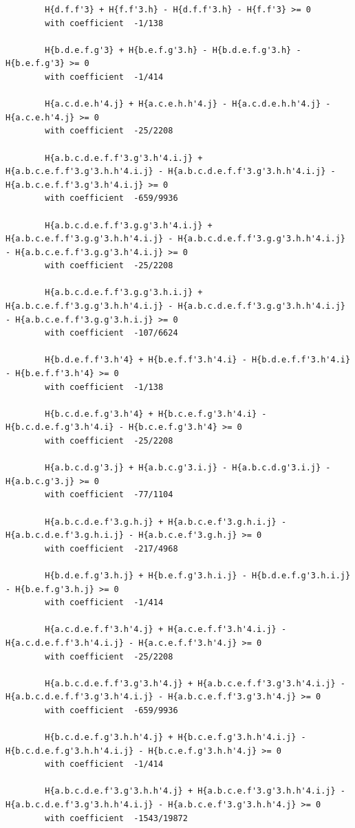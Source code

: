 \documentclass[11pt, a4paper]{kybernetika}
\begin{document}
\begin{verbatim}
		H{d.f.f'3} + H{f.f'3.h} - H{d.f.f'3.h} - H{f.f'3} >= 0
		with coefficient  -1/138
		
		H{b.d.e.f.g'3} + H{b.e.f.g'3.h} - H{b.d.e.f.g'3.h} - H{b.e.f.g'3} >= 0
		with coefficient  -1/414
		
		H{a.c.d.e.h'4.j} + H{a.c.e.h.h'4.j} - H{a.c.d.e.h.h'4.j} - H{a.c.e.h'4.j} >= 0
		with coefficient  -25/2208
		
		H{a.b.c.d.e.f.f'3.g'3.h'4.i.j} + H{a.b.c.e.f.f'3.g'3.h.h'4.i.j} - H{a.b.c.d.e.f.f'3.g'3.h.h'4.i.j} - H{a.b.c.e.f.f'3.g'3.h'4.i.j} >= 0
		with coefficient  -659/9936
		
		H{a.b.c.d.e.f.f'3.g.g'3.h'4.i.j} + H{a.b.c.e.f.f'3.g.g'3.h.h'4.i.j} - H{a.b.c.d.e.f.f'3.g.g'3.h.h'4.i.j} - H{a.b.c.e.f.f'3.g.g'3.h'4.i.j} >= 0
		with coefficient  -25/2208
		
		H{a.b.c.d.e.f.f'3.g.g'3.h.i.j} + H{a.b.c.e.f.f'3.g.g'3.h.h'4.i.j} - H{a.b.c.d.e.f.f'3.g.g'3.h.h'4.i.j} - H{a.b.c.e.f.f'3.g.g'3.h.i.j} >= 0
		with coefficient  -107/6624
		
		H{b.d.e.f.f'3.h'4} + H{b.e.f.f'3.h'4.i} - H{b.d.e.f.f'3.h'4.i} - H{b.e.f.f'3.h'4} >= 0
		with coefficient  -1/138
		
		H{b.c.d.e.f.g'3.h'4} + H{b.c.e.f.g'3.h'4.i} - H{b.c.d.e.f.g'3.h'4.i} - H{b.c.e.f.g'3.h'4} >= 0
		with coefficient  -25/2208
		
		H{a.b.c.d.g'3.j} + H{a.b.c.g'3.i.j} - H{a.b.c.d.g'3.i.j} - H{a.b.c.g'3.j} >= 0
		with coefficient  -77/1104
		
		H{a.b.c.d.e.f'3.g.h.j} + H{a.b.c.e.f'3.g.h.i.j} - H{a.b.c.d.e.f'3.g.h.i.j} - H{a.b.c.e.f'3.g.h.j} >= 0
		with coefficient  -217/4968
		
		H{b.d.e.f.g'3.h.j} + H{b.e.f.g'3.h.i.j} - H{b.d.e.f.g'3.h.i.j} - H{b.e.f.g'3.h.j} >= 0
		with coefficient  -1/414
		
		H{a.c.d.e.f.f'3.h'4.j} + H{a.c.e.f.f'3.h'4.i.j} - H{a.c.d.e.f.f'3.h'4.i.j} - H{a.c.e.f.f'3.h'4.j} >= 0
		with coefficient  -25/2208
		
		H{a.b.c.d.e.f.f'3.g'3.h'4.j} + H{a.b.c.e.f.f'3.g'3.h'4.i.j} - H{a.b.c.d.e.f.f'3.g'3.h'4.i.j} - H{a.b.c.e.f.f'3.g'3.h'4.j} >= 0
		with coefficient  -659/9936
		
		H{b.c.d.e.f.g'3.h.h'4.j} + H{b.c.e.f.g'3.h.h'4.i.j} - H{b.c.d.e.f.g'3.h.h'4.i.j} - H{b.c.e.f.g'3.h.h'4.j} >= 0
		with coefficient  -1/414
		
		H{a.b.c.d.e.f'3.g'3.h.h'4.j} + H{a.b.c.e.f'3.g'3.h.h'4.i.j} - H{a.b.c.d.e.f'3.g'3.h.h'4.i.j} - H{a.b.c.e.f'3.g'3.h.h'4.j} >= 0
		with coefficient  -1543/19872
		

\end{verbatim}
\end{document}
